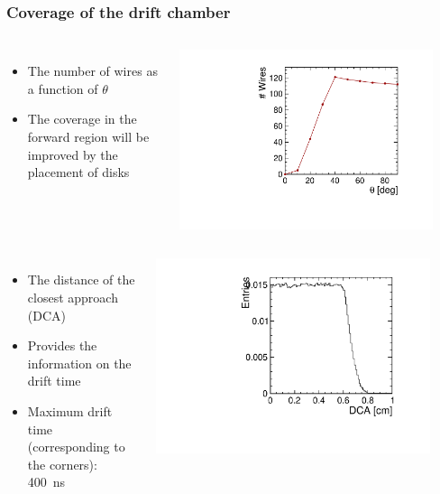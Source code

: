 \documentclass[hyperref={colorlinks=true,pdfpagelabels=false,linkcolor=black}, xcolor=dvipsnames,10pt]{beamer}
\begin{document}
\begin{frame}
	\frametitle{Coverage of the drift chamber}



  \begin{columns}
    \begin{itemize}
      \item The number of wires as a function of $\theta$
      \item The coverage in the forward region will be improved by the placement of disks
    \end{itemize}

      \centering
      \includegraphics[width=0.9\textwidth]{./figures/numWires_theta.pdf}
  \end{columns}

  \begin{columns}
    \begin{itemize}
      \item The distance of the closest approach (DCA)
      \item Provides the information on the drift time
      \item Maximum drift time (corresponding to the corners): 400~ns
    \end{itemize}

      \centering
      \includegraphics[width=0.9\textwidth]{./figures/DCA.pdf}
  \end{columns}


\end{frame}
\end{document}
